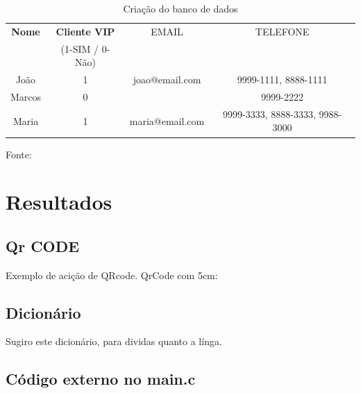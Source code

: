 \begin{table}[H]
\center
  \caption{Criação do banco de dados}
  \begin{tabular}{ | c | c  | c | c |}
      \hline
      \textbf{Nome} & \textbf{Cliente VIP} & EMAIL & TELEFONE \\
          & (1-SIM / 0-Não)  &  &    \\
      \hline
          João & 1 & joao@email.com & 9999-1111, 8888-1111 \\
      \hline
          Marcos & 0 &  & 9999-2222 \\
      \hline
          Maria & 1 &maria@email.com & 9999-3333, 8888-3333, 9988-3000 \\
      \hline
  \end{tabular}
  \label{tab:banco}
  \flushleft %

  {\fontsize{10pt}{\baselineskip}\selectfont
    Fonte: }
\end{table}


\section{Resultados}
\lipsum[2-2]



\subsection{Qr CODE}
\par Exemplo de acição de QRcode.
\qquad
QrCode com 5cm:
\quad
{}

\subsection{Dicionário}

\par Sugiro este dicionário, para dividas quanto a línga.
\quad
{}

\subsection{Código externo no main.c}




